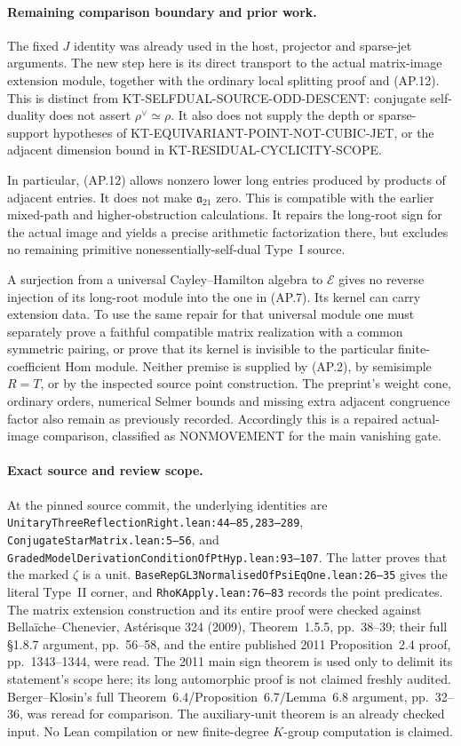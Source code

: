 \paragraph{Remaining comparison boundary and prior work.}
The fixed $J$ identity was already used in the host, projector
and sparse-jet arguments.  The new step here is its direct
transport to the actual matrix-image extension module,
together with the ordinary local splitting proof and (AP.12).
This is distinct from KT-SELFDUAL-SOURCE-ODD-DESCENT:
conjugate self-duality does not assert $\rho^\vee\simeq\rho$.
It also does not supply the depth or sparse-support hypotheses
of KT-EQUIVARIANT-POINT-NOT-CUBIC-JET, or the adjacent
dimension bound in KT-RESIDUAL-CYCLICITY-SCOPE.

In particular, (AP.12) allows nonzero lower long entries
produced by products of adjacent entries.  It does not make
$\mathfrak a_{21}$ zero.  This is compatible with the earlier
mixed-path and higher-obstruction calculations.  It repairs
the long-root sign for the actual image and yields a precise
arithmetic factorization there, but excludes no remaining
primitive nonessentially-self-dual Type~I source.

A surjection from a universal Cayley--Hamilton algebra to
$\mathcal E$ gives no reverse injection of its long-root
module into the one in (AP.7).  Its kernel can carry
extension data.  To use the same repair for that universal
module one must separately prove a faithful compatible
matrix realization with a common symmetric pairing, or
prove that its kernel is invisible to the particular
finite-coefficient Hom module.  Neither premise is supplied
by (AP.2), by semisimple $R=T$, or by the inspected source
point construction.  The preprint's weight cone, ordinary
orders, numerical Selmer bounds and missing extra adjacent
congruence factor also remain as previously recorded.
Accordingly this is a repaired actual-image comparison,
classified as NONMOVEMENT for the main vanishing gate.

\paragraph{Exact source and review scope.}
At the pinned source commit, the underlying identities are
\texttt{UnitaryThreeReflectionRight.lean:44--85,283--289},
\texttt{ConjugateStarMatrix.lean:5--56}, and
\texttt{GradedModelDerivationConditionOfPtHyp.lean:93--107}.
The latter proves that the marked $\zeta$ is a unit.
\texttt{BaseRepGL3NormalisedOfPsiEqOne.lean:26--35} gives
the literal Type~II corner, and
\texttt{RhoKApply.lean:76--83} records the point predicates.
The matrix extension construction and its entire proof were
checked against Bella\"iche--Chenevier, Ast\'erisque 324
(2009), Theorem~1.5.5, pp.~38--39; their full
\S1.8.7 argument, pp.~56--58, and the entire published
2011 Proposition~2.4 proof, pp.~1343--1344, were read.
The 2011 main sign theorem is used only to delimit its
statement's scope here; its long automorphic proof is not
claimed freshly audited.  Berger--Klosin's full
Theorem~6.4/Proposition~6.7/Lemma~6.8 argument, pp.~32--36,
was reread for comparison.  The auxiliary-unit theorem
is an already checked input.  No Lean compilation or
new finite-degree $K$-group computation is claimed.
